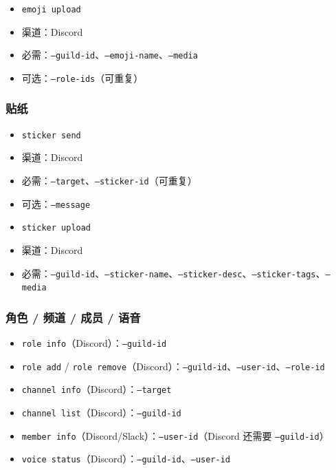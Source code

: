 \begin{itemize}
  \item \texttt{emoji upload}
  \item 渠道：Discord
  \item 必需：\texttt{--guild-id}、\texttt{--emoji-name}、\texttt{--media}
  \item 可选：\texttt{--role-ids}（可重复）
\end{itemize}


\subsubsection{贴纸}


\begin{itemize}
  \item \texttt{sticker send}
  \item 渠道：Discord
  \item 必需：\texttt{--target}、\texttt{--sticker-id}（可重复）
  \item 可选：\texttt{--message}
\end{itemize}


\begin{itemize}
  \item \texttt{sticker upload}
  \item 渠道：Discord
  \item 必需：\texttt{--guild-id}、\texttt{--sticker-name}、\texttt{--sticker-desc}、\texttt{--sticker-tags}、\texttt{--media}
\end{itemize}


\subsubsection{角色 / 频道 / 成员 / 语音}


\begin{itemize}
  \item \texttt{role info}（Discord）：\texttt{--guild-id}
  \item \texttt{role add} / \texttt{role remove}（Discord）：\texttt{--guild-id}、\texttt{--user-id}、\texttt{--role-id}
  \item \texttt{channel info}（Discord）：\texttt{--target}
  \item \texttt{channel list}（Discord）：\texttt{--guild-id}
  \item \texttt{member info}（Discord/Slack）：\texttt{--user-id}（Discord 还需要 \texttt{--guild-id}）
  \item \texttt{voice status}（Discord）：\texttt{--guild-id}、\texttt{--user-id}
\end{itemize}


